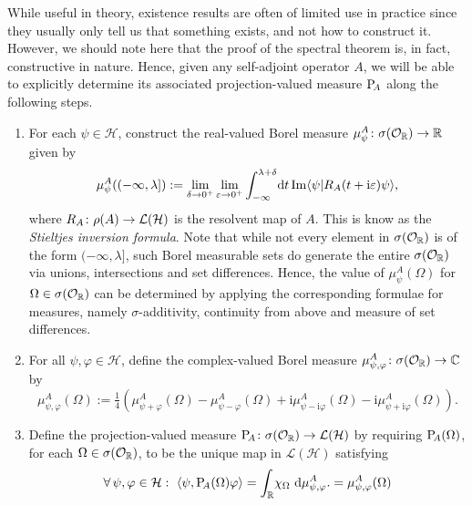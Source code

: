 While useful in theory, existence results are often of limited use in practice since they usually only tell us that something exists, and not how to construct it. However, we should note here that the proof of the spectral theorem is, in fact, constructive in nature. Hence, given any self-adjoint operator $A$, we will be able to explicitly determine its associated projection-valued measure $\mathrm{P}_{\negmedspace A}$ along the following steps.
\begin{enumerate}[label=(\roman*)]
  \item For each $\psi\in\mathcal{H}$, construct the real-valued Borel measure $\mu^A_{\psi}\colon \sigma(\mathcal{O}_{\mathbb{R}})\to \mathbb{R}$ given by
  \begin{equation*}
  \mu^A_{\psi} ((-\infty,\lambda]):= \lim_{\delta\to 0^+} \lim_{\varepsilon\to 0^+} \int_{-\infty}^{\lambda+\delta}\!\mathop{}\!\mathrm{d} t  \operatorname{Im}\langle\psi | R_A(t+\mathrm{i}\varepsilon)\psi\rangle ,
  \end{equation*}
  where $R_A\colon\rho(A)\to \mathcal{L}(\mathcal{H})$ is the resolvent map of $A$. This is know as the \emph{Stieltjes inversion formula}. Note that while not every element in $\sigma(\mathcal{O}_{\mathbb{R}})$ is of the form $(-\infty,\lambda]$, such Borel measurable sets do generate the entire $\sigma(\mathcal{O}_{\mathbb{R}})$ via unions, intersections and set differences. Hence, the value of $\mu^A_{\psi}(\Omega)$ for $\Omega\in\sigma(\mathcal{O}_{\mathbb{R}})$ can be determined by applying the corresponding formulae for measures, namely $\sigma$-additivity, continuity from above and measure of set differences.
  \item For all $\psi,\varphi\in\mathcal{H}$, define the complex-valued Borel measure $\mu^A_{\psi,\varphi}\colon\sigma(\mathcal{O}_{\mathbb{R}})\to\mathbb{C}$ by
  \begin{equation*}
  \mu^A_{\psi,\varphi}(\Omega):=\tfrac{1}{4}(\mu^A_{\psi+\varphi}(\Omega)-\mu^A_{\psi-\varphi}(\Omega)+\mathrm{i}\mu^A_{\psi-\mathrm{i}\varphi}(\Omega)-\mathrm{i}\mu^A_{\psi+\mathrm{i}\varphi}(\Omega)).
  \end{equation*}
  \item Define the projection-valued measure $\mathrm{P}_{\negmedspace A}\colon \sigma(\mathcal{O}_{\mathbb{R}})\to\mathcal{L}(\mathcal{H})$ by requiring $\mathrm{P}_{\negmedspace A}(\Omega)$, for each $\Omega\in\sigma(\mathcal{O}_{\mathbb{R}})$, to be the unique map in $\mathcal{L}(\mathcal{H})$ satisfying
  \begin{equation*}
    \forall\, \psi,\varphi\in\mathcal{H}:\
    \langle\psi,\mathrm{P}_{\negmedspace A}(\Omega)\varphi\rangle
    = \int_{\mathbb{R}}\!\chi_{\Omega}\,\mathop{}\!\mathrm{d}\mu^A_{\psi,\varphi}.
    = \mu^{A}_{\psi,\varphi}(\Omega)
  \end{equation*}
\end{enumerate}

